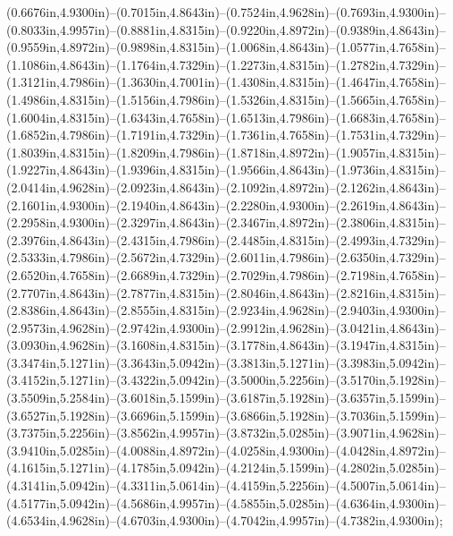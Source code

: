 (0.6676in,4.9300in)--(0.7015in,4.8643in)--(0.7524in,4.9628in)--(0.7693in,4.9300in)--(0.8033in,4.9957in)--(0.8881in,4.8315in)--(0.9220in,4.8972in)--(0.9389in,4.8643in)--(0.9559in,4.8972in)--(0.9898in,4.8315in)--(1.0068in,4.8643in)--(1.0577in,4.7658in)--(1.1086in,4.8643in)--(1.1764in,4.7329in)--(1.2273in,4.8315in)--(1.2782in,4.7329in)--(1.3121in,4.7986in)--(1.3630in,4.7001in)--(1.4308in,4.8315in)--(1.4647in,4.7658in)--(1.4986in,4.8315in)--(1.5156in,4.7986in)--(1.5326in,4.8315in)--(1.5665in,4.7658in)--(1.6004in,4.8315in)--(1.6343in,4.7658in)--(1.6513in,4.7986in)--(1.6683in,4.7658in)--(1.6852in,4.7986in)--(1.7191in,4.7329in)--(1.7361in,4.7658in)--(1.7531in,4.7329in)--(1.8039in,4.8315in)--(1.8209in,4.7986in)--(1.8718in,4.8972in)--(1.9057in,4.8315in)--(1.9227in,4.8643in)--(1.9396in,4.8315in)--(1.9566in,4.8643in)--(1.9736in,4.8315in)--(2.0414in,4.9628in)--(2.0923in,4.8643in)--(2.1092in,4.8972in)--(2.1262in,4.8643in)--(2.1601in,4.9300in)--(2.1940in,4.8643in)--(2.2280in,4.9300in)--(2.2619in,4.8643in)--(2.2958in,4.9300in)--(2.3297in,4.8643in)--(2.3467in,4.8972in)--(2.3806in,4.8315in)--(2.3976in,4.8643in)--(2.4315in,4.7986in)--(2.4485in,4.8315in)--(2.4993in,4.7329in)--(2.5333in,4.7986in)--(2.5672in,4.7329in)--(2.6011in,4.7986in)--(2.6350in,4.7329in)--(2.6520in,4.7658in)--(2.6689in,4.7329in)--(2.7029in,4.7986in)--(2.7198in,4.7658in)--(2.7707in,4.8643in)--(2.7877in,4.8315in)--(2.8046in,4.8643in)--(2.8216in,4.8315in)--(2.8386in,4.8643in)--(2.8555in,4.8315in)--(2.9234in,4.9628in)--(2.9403in,4.9300in)--(2.9573in,4.9628in)--(2.9742in,4.9300in)--(2.9912in,4.9628in)--(3.0421in,4.8643in)--(3.0930in,4.9628in)--(3.1608in,4.8315in)--(3.1778in,4.8643in)--(3.1947in,4.8315in)--(3.3474in,5.1271in)--(3.3643in,5.0942in)--(3.3813in,5.1271in)--(3.3983in,5.0942in)--(3.4152in,5.1271in)--(3.4322in,5.0942in)--(3.5000in,5.2256in)--(3.5170in,5.1928in)--(3.5509in,5.2584in)--(3.6018in,5.1599in)--(3.6187in,5.1928in)--(3.6357in,5.1599in)--(3.6527in,5.1928in)--(3.6696in,5.1599in)--(3.6866in,5.1928in)--(3.7036in,5.1599in)--(3.7375in,5.2256in)--(3.8562in,4.9957in)--(3.8732in,5.0285in)--(3.9071in,4.9628in)--(3.9410in,5.0285in)--(4.0088in,4.8972in)--(4.0258in,4.9300in)--(4.0428in,4.8972in)--(4.1615in,5.1271in)--(4.1785in,5.0942in)--(4.2124in,5.1599in)--(4.2802in,5.0285in)--(4.3141in,5.0942in)--(4.3311in,5.0614in)--(4.4159in,5.2256in)--(4.5007in,5.0614in)--(4.5177in,5.0942in)--(4.5686in,4.9957in)--(4.5855in,5.0285in)--(4.6364in,4.9300in)--(4.6534in,4.9628in)--(4.6703in,4.9300in)--(4.7042in,4.9957in)--(4.7382in,4.9300in);
